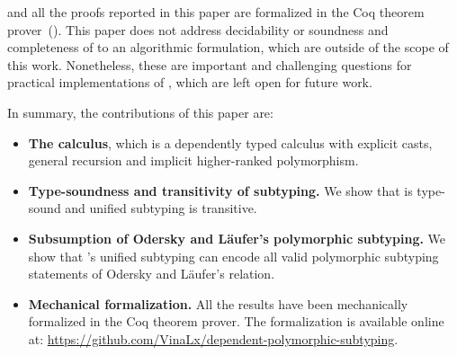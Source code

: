 \name and all the proofs reported in this paper are formalized in the Coq theorem
prover~(\citeauthor{coqsite}).
This paper does not address decidability or soundness and completeness of \name to an
algorithmic formulation, which are outside of the scope of this work.
Nonetheless, these are important and challenging
questions for practical implementations of \name, which are left open for future work.

In summary, the contributions of this paper are:

\begin{itemize}

\item {\bf The \name calculus}, which is a dependently typed calculus with explicit casts,
  general recursion and implicit higher-ranked polymorphism.

\item {\bf Type-soundness and transitivity of subtyping.} We show that \name
  is type-sound and unified subtyping is transitive.

\item {\bf Subsumption of Odersky and L\"aufer's polymorphic subtyping.} We show that \name's
  unified subtyping can encode all valid polymorphic subtyping statements of Odersky and L\"aufer's
  relation.

\item {\bf Mechanical formalization.} All the results have been mechanically
  formalized in the Coq theorem prover. The formalization is available online at:
  \url{https://github.com/VinaLx/dependent-polymorphic-subtyping}.

\end{itemize}
